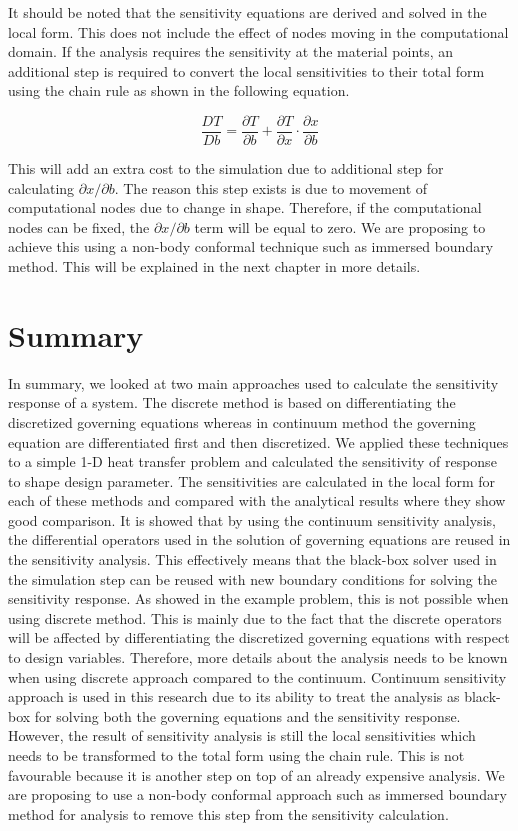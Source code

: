 It should be noted that the sensitivity equations are derived and solved in the local form. This does not include the effect of nodes moving in the computational domain. If the analysis requires the sensitivity at the material points, an additional step is required to convert the local sensitivities to their total form using the chain rule as shown in the following equation.

\begin{equation*}
	\frac{DT}{Db} = \frac{\partial T}{\partial b} + \frac{\partial T}{\partial x} \cdot \frac{\partial x}{\partial b}
\end{equation*}

This will add an extra cost to the simulation due to additional step for calculating $\partial x/\partial b$. The reason this step exists is due to movement of computational nodes due to change in shape. Therefore, if the computational nodes can be fixed, the $\partial x/\partial b$ term will be equal to zero. We are proposing to achieve this using a non-body conformal technique such as immersed boundary method. This will be explained in the next chapter in more details.

\section{Summary}
In summary, we looked at two main approaches used to calculate the sensitivity response of a system. The discrete method is based on differentiating the discretized governing equations whereas in continuum method the governing equation are differentiated first and then discretized. We applied these techniques to a simple 1-D heat transfer problem and calculated the sensitivity of response to shape design parameter. The sensitivities are calculated in the local form for each of these methods and compared with the analytical results where they show good comparison. It is showed that by using the continuum sensitivity analysis, the differential operators used in the solution of governing equations are reused in the sensitivity analysis. This effectively means that the black-box solver used in the simulation step can be reused with new boundary conditions for solving the sensitivity response. As showed in the example problem, this is not possible when using discrete method. This is mainly due to the fact that the discrete operators will be affected by differentiating the discretized governing equations with respect to design variables. Therefore, more details about the analysis needs to be known when using discrete approach compared to the continuum. Continuum sensitivity approach is used in this research due to its ability to treat the analysis as black-box for solving both the governing equations and the sensitivity response. However, the result of sensitivity analysis is still the local sensitivities which needs to be transformed to the total form using the chain rule. This is not favourable because it is another step on top of an already expensive analysis. We are proposing to use a non-body conformal approach such as immersed boundary method for analysis to remove this step from the sensitivity calculation.